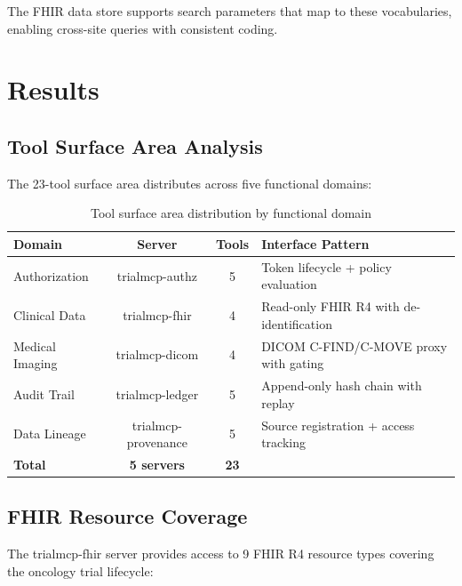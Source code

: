 \documentclass[10pt,letterpaper]{article}
\begin{document}
The FHIR data store supports search parameters that map to these vocabularies, enabling cross-site queries with consistent coding.

\section{Results}

\subsection{Tool Surface Area Analysis}

The 23-tool surface area distributes across five functional domains:

\begin{table}[H]
\centering
\caption{Tool surface area distribution by functional domain}
\label{tab:toolarea}
\small
\begin{tabularx}{\textwidth}{l c c X}
\toprule
\textbf{Domain} & \textbf{Server} & \textbf{Tools} & \textbf{Interface Pattern} \\
\midrule
Authorization & trialmcp-authz & 5 & Token lifecycle + policy evaluation \\
Clinical Data & trialmcp-fhir & 4 & Read-only FHIR R4 with de-identification \\
Medical Imaging & trialmcp-dicom & 4 & DICOM C-FIND/C-MOVE proxy with gating \\
Audit Trail & trialmcp-ledger & 5 & Append-only hash chain with replay \\
Data Lineage & trialmcp-provenance & 5 & Source registration + access tracking \\
\midrule
\textbf{Total} & \textbf{5 servers} & \textbf{23} & \\
\bottomrule
\end{tabularx}
\end{table}

\subsection{FHIR Resource Coverage}

The trialmcp-fhir server provides access to 9 FHIR R4 resource types covering the oncology trial lifecycle:
\end{document}
